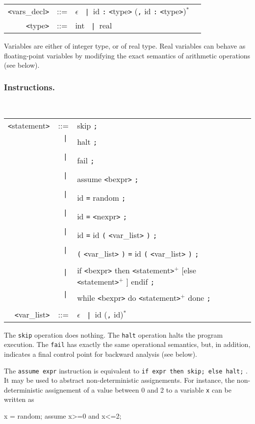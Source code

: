 \documentclass[a4paper,11pt]{article}
\newcommand{\pkw}[1]{\textcolor{progkeyword}{#1}}
\newcommand{\sx}[1]{\textcolor{prog}{\texttt{<}#1\texttt{>}}}
\newcommand{\tk}[1]{\textcolor{token}{\texttt{#1}}}
\newcommand{\sor}{\texttt{~|~}}
\newenvironment{syntax}
{
\T\medskip
\begin{tabular}{rcll}
}
{
\end{tabular}
\T\par\medskip
}
\newenvironment{prog}
{\begin{example}\color{prog}}
{\end{example}\par}
\begin{document}
\begin{syntax}
  \sx{vars\_decl} & ::= & $\epsilon$ \sor id \tk{:} \sx{type} (\tk{,} id \tk{:} \sx{type})$^*$ \\
\sx{type} & ::= & \pkw{int} \sor \pkw{real} \\
\end{syntax}
Variables are either of integer type, or of real type. Real
variables can behave as floating-point variables by modifying the
exact semantics of arithmetic operations (see below).

\subsubsection{Instructions.}\T~

\begin{syntax}
  \sx{statement} &::=& \pkw{skip} \tk{;} \\
  &\sor& \pkw{halt} \tk{;} \\
  &\sor& \pkw{fail} \tk{;} \\
  &\sor& \pkw{assume} \sx{bexpr} \tk{;} \\
  &\sor& id \tk{=} \pkw{random} \tk{;} \\
  &\sor& id \tk{=} \sx{nexpr} \tk{;} \\
  &\sor& id \tk{=} id \tk{(} \sx{var\_list} \tk{)} \tk{;} \\
  &\sor& \tk{(} \sx{var\_list} \tk{)} \tk{=} id \tk{(} \sx{var\_list} \tk{)} \tk{;} \\
  &\sor& \pkw{if} \sx{bexpr} \pkw{then} \sx{statement}$^+$ [\pkw{else} \sx{statement}$^+$ ] \pkw{endif} \tk{;} \\
  &\sor& \pkw{while} \sx{bexpr} \pkw{do} \sx{statement}$^+$ \pkw{done} \tk{;} \\
  \sx{var\_list} &::=& $\epsilon$ \sor id (\tk{,} id)$^*$
\end{syntax}

The \texttt{skip} operation does nothing.  The \texttt{halt}
operation halts the program execution. The \texttt{fail} has
exactly the same operational semantics, but, in addition,
indicates a final control point for backward analysis (see below).

The \texttt{assume expr} instruction is equivalent to \texttt{if
  expr then skip; else halt;} . It may be used to abstract
non-deterministic assignements. For instance, the
non-deterministic assignement of a value between 0 and 2 to a
variable \texttt{x} can be written as 
\begin{prog}
  x = random; 
  assume x>=0 and x<=2;
\end{prog}
\end{document}
